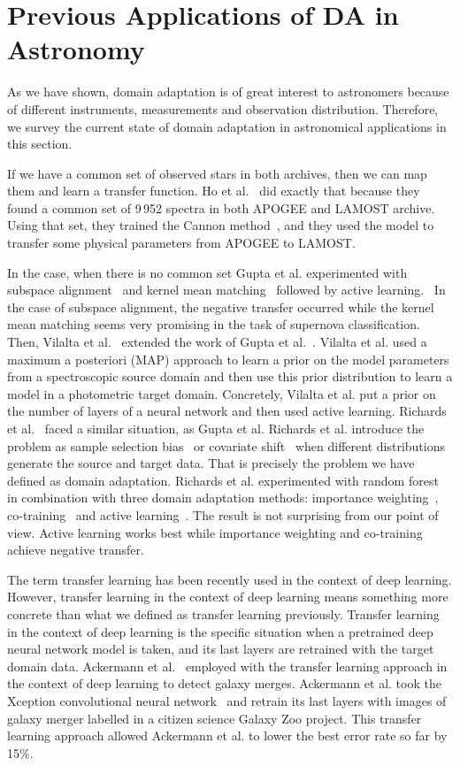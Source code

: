\section{Previous Applications of DA in Astronomy}

As we have shown, domain adaptation is of great interest to astronomers
because of different instruments, measurements and observation distribution.
Therefore, we survey the current state of domain adaptation in astronomical applications in this section.

If we have a common set of observed stars in both archives,
then we can map them and learn a transfer function.
Ho et al.~\cite{ho2017} did exactly that
because they found a common set of 9\,952 spectra in both APOGEE and LAMOST archive.
Using that set, they trained the Cannon method~\cite{ness2015},
and they used the model to transfer some physical parameters from APOGEE to LAMOST.

In the case, when there is no common set Gupta et al. experimented with subspace alignment~\cite{fernando2014} and kernel mean matching~\cite{gretton2009} followed by active learning.~\cite{gupta2016}
In the case of subspace alignment, the negative transfer occurred while the kernel mean matching seems very promising in the task of supernova classification.
Then, Vilalta et al.~\cite{vilalta2018} extended the work of Gupta et al.~\cite{gupta2016}.
Vilalta et al. used a maximum a posteriori (MAP) approach to learn a prior on the model parameters from a spectroscopic source domain
and then use this prior distribution to learn a model in a photometric target domain.
Concretely, Vilalta et al. put a prior on the number of layers of a neural network
and then used active learning.
Richards et al.~\cite{richards2011} faced a similar situation, as Gupta et al.
Richards et al. introduce the problem as sample selection bias~\cite{shimodaira2000} or covariate shift~\cite{heckman1979}
when different distributions generate the source and target data.
That is precisely the problem we have defined as domain adaptation.
Richards et al. experimented with random forest in combination with three domain adaptation methods:
importance weighting~\cite{shimodaira2000}, co-training~\cite{blum1998} and active learning~\cite{settles2009}.
The result is not surprising from our point of view.
Active learning works best while importance weighting and co-training achieve negative transfer.

The term transfer learning has been recently used in the context of deep learning.
However, transfer learning in the context of deep learning means something more concrete than what we defined as transfer learning previously.
Transfer learning in the context of deep learning is the specific situation
when a pretrained deep neural network model is taken,
and its last layers are retrained with the target domain data.
Ackermann et al.~\cite{ackermann2018} employed with the transfer learning approach in the context of deep learning to detect galaxy merges.
Ackermann et al. took the Xception convolutional neural network~\cite{chollet2017}
and retrain its last layers with images of galaxy merger labelled in a citizen science Galaxy Zoo project.
This transfer learning approach allowed Ackermann et al. to lower the best error rate so far by 15\%.
